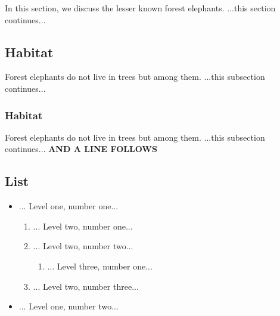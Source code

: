 \documentclass{article}
\begin{document}
\par
In this section, we discuss the lesser known forest elephants.
...this section continues...
\subsection{Habitat}

\par
Forest elephants do not live in trees but among them.
...this subsection continues... 
\subsubsection{Habitat}

\par
Forest elephants do not live in trees but among them.
...this subsection continues...  \textbf{AND A LINE FOLLOWS}

\subsection{List}
\begin{itemize}
\item  ... Level one, number one...

\begin{enumerate}
\item  ... Level two, number one...
\item  ... Level two, number two...

\begin{enumerate}
\item  ... Level three, number one...
\end{enumerate}
\item  ... Level two, number three...
\end{enumerate}
\item  ... Level one, number two...
\end{itemize}
\end{document}

